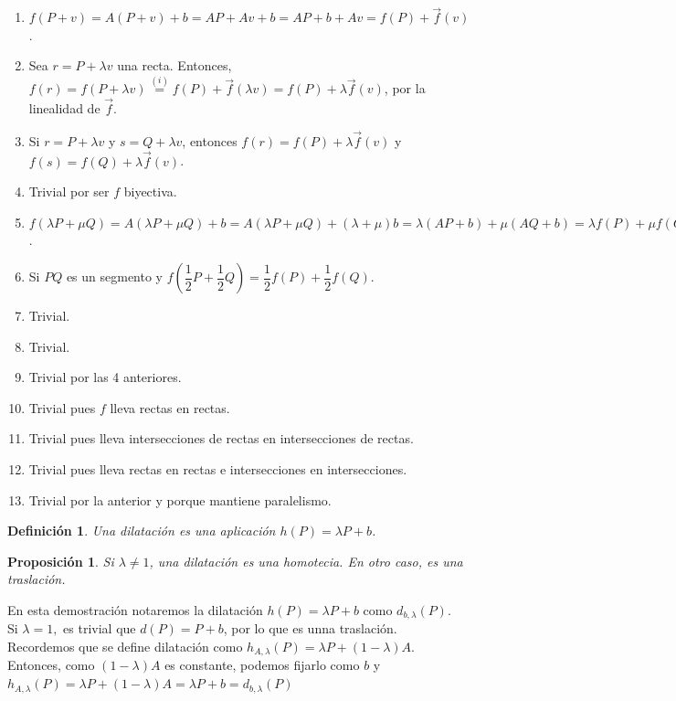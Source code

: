 \documentclass[11pt, a4paper]{article}
\makeatletter
\newif\IfInSansMode
\let\oldsf\sffamily
\renewcommand*{\sffamily}{\oldsf\mathversion{sans}\InSansModetrue}
\let\oldnorm\normalfont
\renewcommand*{\normalfont}{\oldnorm\InSansModefalse\mathversion{normal}}
\renewenvironment{proof}[1][\proofname] {\vspace{-15pt}\par\pushQED{\qed}\normalfont\topsep6\p@\@plus6\p@\relax\trivlist\item[\hskip\labelsep\it#1\@addpunct{.}]\ignorespaces}{\popQED\endtrivlist\@endpefalse}
\renewcommand{\vec}{\overrightarrow}
\renewenvironment{proof}[1][\proofname] {\par\pushQED{\qed}\normalfont\topsep6\p@\@plus6\p@\relax\trivlist\item[\hskip\labelsep\itshape\sffamily#1\@addpunct{.}]\ignorespaces}{\popQED\endtrivlist\@endpefalse}
\theoremstyle{theorem-style}
\newtheorem{nprop}{Proposición}[section]
\theoremstyle{definition-style}
\newtheorem{ndef}{Definición}[section]
\theoremstyle{remark-style}
\theoremstyle{example-style}
\newenvironment{nlist}
{\begin{enumerate}
    \renewcommand\labelenumi{(\emph{\roman{enumi})}}}
  {\end{enumerate}}
\makeatother
\begin{document}
\begin{proof}\hfill
  \begin{nlist}
  \item $f(P+v) = A(P+v) + b = AP + Av + b = AP + b + Av = f(P) + \vec{f}(v)$.
  \item Sea $r = P + \lambda v$ una recta. Entonces, $f(r) = f(P + \lambda v) \overset{(i)}{=} f(P) + \vec{f}(\lambda v) = f(P) + \lambda \vec{f}(v)$, por la linealidad de $\vec{f}$.
  \item Si $r = P + \lambda v$ y $s = Q + \lambda v$, entonces $f(r) = f(P) + \lambda \vec{f}(v)$ y $f(s) = f(Q) + \lambda \vec{f}(v)$.
  \item Trivial por ser $f$ biyectiva.
  \item $f(\lambda P + \mu Q) = A(\lambda P + \mu Q) + b =A(\lambda P + \mu Q) + (\lambda + \mu)b = \lambda (AP + b) + \mu (AQ + b) = \lambda f(P) + \mu f(Q)$.
  \item Si $PQ$ es un segmento y $f(\dfrac{1}{2}P + \dfrac{1}{2}Q) = \dfrac{1}{2}f(P) +  \dfrac{1}{2}f(Q)$.
  \item Trivial.
  \item Trivial.
  \item Trivial por las 4 anteriores.
  \item Trivial pues $f$ lleva rectas en rectas.
  \item Trivial pues lleva intersecciones de rectas en intersecciones de rectas.
  \item Trivial pues lleva rectas en rectas e intersecciones en intersecciones.
  \item Trivial por la anterior y porque mantiene paralelismo.

    
  \end{nlist}
\end{proof}


\begin{ndef}
	Una dilatación es una aplicación $h(P) = \lambda P + b$. 
\end{ndef}

\begin{nprop} 
Si $\lambda \ne 1$, una dilatación es una homotecia. En otro caso, es una traslación. 
	
\end{nprop}

\begin{proof}
	En esta demostración notaremos la dilatación $h(P) = \lambda P + b$ como $d_{b,\lambda}(P)$.\\
	Si $\lambda = 1,$ es trivial que $d(P) = P + b$, por lo que es unna traslación.\\
	Recordemos que se define dilatación como $h_{A,\lambda}(P) = \lambda P + (1-\lambda)A $. Entonces, como $ (1-\lambda)A $ es constante, podemos fijarlo como $b$ y $h_{A,\lambda} (P)= \lambda P + (1-\lambda)A  = \lambda P + b  = d_{b,\lambda} (P) $
\end{proof}
\end{document}
